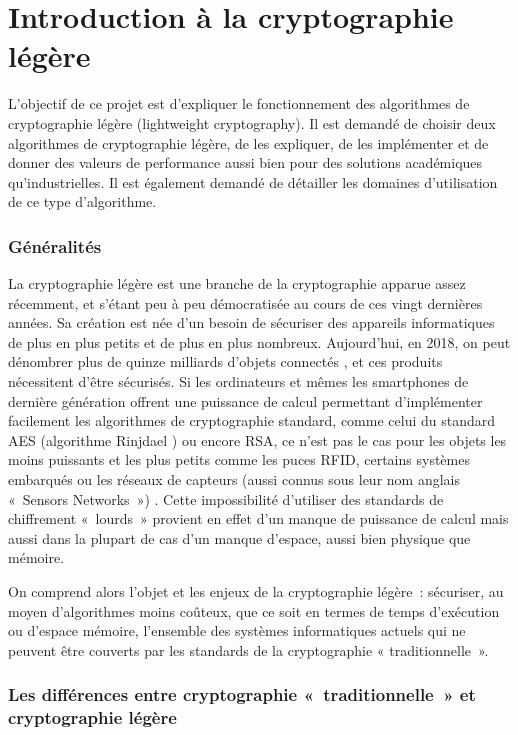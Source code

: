\newpage
\part{Introduction à la cryptographie légère}

L'objectif de ce projet est d'expliquer le fonctionnement des algorithmes de cryptographie légère (lightweight cryptography).
Il est demandé de choisir deux algorithmes de cryptographie légère, de les expliquer,
de les implémenter et de donner des valeurs de performance aussi bien pour des solutions académiques qu'industrielles.
Il est également demandé de détailler les domaines d'utilisation de ce type d'algorithme.

\section{Généralités}

La cryptographie légère est une branche de la cryptographie apparue assez
récemment, et s'étant peu à peu démocratisée au cours de ces vingt
dernières années. Sa création est née d'un besoin de sécuriser des
appareils informatiques de plus en plus petits et de plus en plus
nombreux. Aujourd'hui, en 2018, on peut dénombrer  plus de  quinze
milliards d'objets connectés \cite{renaud_developpement_2017}, et ces
produits nécessitent d'être sécurisés. Si les ordinateurs et mêmes les
smartphones de dernière génération offrent une puissance de calcul
permettant d’implémenter facilement les algorithmes de cryptographie
standard, comme celui du standard AES (algorithme Rinjdael
\cite{AES-FIPS}) ou encore RSA, ce n’est pas le cas pour les objets les
moins puissants et les plus petits comme les puces RFID,
certains systèmes embarqués ou les réseaux de capteurs (aussi connus sous
leur nom anglais « Sensors Networks ») \cite{Report_light}. Cette
impossibilité d'utiliser des standards de chiffrement « lourds » provient
en effet d'un manque de puissance de calcul mais aussi dans la plupart de
cas d'un manque d'espace, aussi bien physique que mémoire.

On comprend alors l'objet et les enjeux de la cryptographie légère :
sécuriser, au moyen d'algorithmes moins coûteux, que ce soit en termes de
temps d'exécution ou d'espace mémoire, l'ensemble des systèmes informatiques
actuels qui ne peuvent être couverts par les standards de la cryptographie «
traditionnelle ».

\section{Les différences entre cryptographie « traditionnelle » et cryptographie légère}

